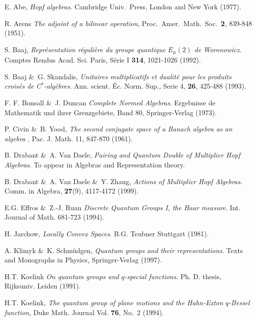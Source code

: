 
\begin{thebibliography}{99}
   {\sc E. Abe},
   {\em Hopf algebras}\@.
   Cambridge Univ.\ Press, London and New York (1977).

 {\sc R. Arens}
   {\em The adjoint of a bilinear operation\/},
   Proc.\ Amer.\ Math.\ Soc.\ {\bf 2}, 839-848 (1951).

 {\sc S. Baaj},
   {\em Repr\'esentation r\'eguli\`ere du groupe quantique $E_\mu(2)$ de Woronowicz}\@.
   Comptes Rendus Acad. Sci. Paris, S\'erie I {\bf 314}, 1021-1026 (1992).

  {\sc S. Baaj \&\ G. Skandalis},
   {\em Unitaires multiplicatifs et dualit\'e pour les produits
        crois\'es de C$^*$-alg\`ebres}\@.
   Ann. scient. \'Ec. Norm. Sup., Serie 4, {\bf 26}, 425-488 (1993).

 {\sc F. F. Bonsall \&\ J. Duncan}
   {\em Complete Normed Algebras}\@.
   Ergebnisse de Mathematik und ihrer Grenzgebiete, Band 80, Springer-Verlag (1973).

 {\sc P. Civin \&\ B. Yood},
   {\em The second conjugate space of a Banach algebra  as an algebra \/},
   Pac. J. Math. 11, 847-870 (1961).

 {\sc B. Drabant \&\ A. Van Daele},
   {\em Pairing and Quantum Double of Multiplier Hopf Algebras}\@.
   To appear in Algebras and Representation theory.

   {\sc B. Drabant \&\ A. Van Daele \&\ Y. Zhang},
   {\em Actions of Multiplier Hopf Algebras}\@.
   Comm. in Algebra, {\bf 27}(9), 4117-4172 (1999).

 {\sc E.G. Effros \&\ Z.-J. Ruan}
   {\em Discrete Quantum Groups I, the Haar measure}\@.
   Int. Journal of Math. 681-723 (1994).

 {\sc H. Jarchow},
   {\em Locally Convex Spaces}\@.
   B.G. Teubner Stuttgart (1981).

 {\sc A. Klimyk \&\ K. Schm\"udgen},
   {\em Quantum groups and their representations}\@.
   Texts and Monographs in Physics, Springer-Verlag (1997).

 {\sc H.T. Koelink}
   {\em On quantum groups and $q$-special functions}\@.
   Ph. D. thesis, Rijksuniv. Leiden (1991).


 {\sc H.T. Koelink},
   {\em The quantum group of plane motions and the Hahn-Exton $q$-Bessel function\/},
        Duke Math. Journal Vol. {\bf 76}, No.\ 2 (1994).


\end{thebibliography}
